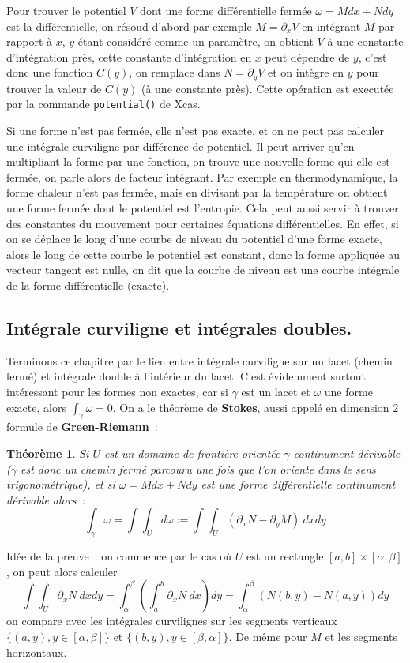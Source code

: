 \documentclass[a4paper,11pt]{article}
\newtheorem{thm}{Théorème}
\begin{document}
\begin{giacjshere}
Pour trouver le potentiel 
$V$ dont une forme diff\'erentielle ferm\'ee
$\omega=M dx+Ndy$ est la diff\'erentielle, on r\'esoud d'abord par exemple 
$ M = \partial_x V $
en int\'egrant $M$ par rapport \`a $x$, $y$ \'etant consid\'er\'e
comme un param\`etre, on obtient $V$ \`a une constante d'int\'egration
pr\`es, cette constante d'int\'egration en $x$ peut d\'ependre
de $y$, c'est donc une fonction $C(y)$, 
on remplace dans $N=\partial_y V$ et on int\`egre
en $y$ pour trouver la valeur de $C(y)$ (\`a une constante pr\`es).
Cette op\'eration est execut\'ee par la commande \verb|potential()|
de Xcas.

Si une forme n'est pas ferm\'ee, elle n'est pas exacte, et on ne peut
pas calculer une int\'egrale curviligne par diff\'erence de potentiel.
Il peut arriver qu'en multipliant la forme par une fonction, on trouve
une nouvelle forme qui elle est ferm\'ee, on parle alors de facteur
int\'egrant. Par exemple en thermodynamique, la forme chaleur
n'est pas ferm\'ee, mais en divisant par la temp\'erature on
obtient une forme ferm\'ee dont le potentiel est l'entropie.
Cela peut aussi servir \`a trouver des constantes du mouvement
pour certaines \'equations diff\'erentielles. En effet, si on
se d\'eplace le long d'une courbe de niveau du potentiel
d'une forme exacte, alors le long de cette courbe le potentiel
est constant, donc la forme appliqu\'ee au vecteur tangent
est nulle, on dit que la courbe de niveau est une courbe
int\'egrale de la forme diff\'erentielle (exacte).

\subsection{Int\'egrale curviligne et int\'egrales doubles.}
Terminons ce chapitre par le lien entre int\'egrale curviligne
sur un lacet (chemin ferm\'e) et int\'egrale double \`a l'int\'erieur 
du lacet. C'est \'evidemment surtout int\'eressant pour les
formes non exactes, car si $\gamma$ est un lacet et $\omega$
une forme exacte, alors $\int_\gamma \omega=0$.
On a le th\'eor\`eme de {\bf Stokes}, 
aussi appel\'e en dimension 2 
formule de {\bf Green-Riemann}~:
\begin{thm}
Si $U$ est un domaine de fronti\`ere orient\'ee
$\gamma$ continument d\'erivable 
($\gamma$ est donc un chemin ferm\'e parcouru une fois que
l'on oriente dans le sens trigonom\'etrique), et si 
$\omega=Mdx + N dy$ est une forme
diff\'erentielle continument d\'erivable alors~:
$$ \int_\gamma \omega = \int\int_U d\omega := 
\int \int_U (\partial_x N -\partial_y M) \ dx dy$$
\end{thm}
Id\'ee de la preuve~: on commence par le cas o\`u $U$ est un
rectangle $[a,b] \times [\alpha,\beta]$, on peut alors calculer 
$$ \int \int_U \partial_x N  \ dx dy 
= \int_\alpha^\beta (\int_a^b \partial_x N  \ dx) dy
= \int_\alpha^\beta (N(b,y)-N(a,y)) dy $$
on compare avec les int\'egrales curvilignes sur les segments verticaux
$\{(a,y), y \in [\alpha,\beta]\}$ et $\{(b,y), y \in [\beta,\alpha]\}$.
De m\^eme pour $M$ et les segments horizontaux.


\end{giacjshere}
\end{document}
